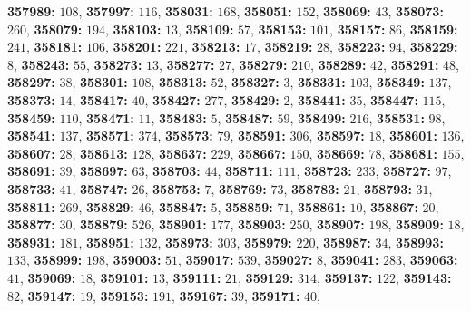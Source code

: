 \textsf{\bfseries 357989:} $108$, \textsf{\bfseries 357997:} $116$, \textsf{\bfseries 358031:} $168$, \textsf{\bfseries 358051:} $152$, \textsf{\bfseries 358069:} $43$, \textsf{\bfseries 358073:} $260$, \textsf{\bfseries 358079:} $194$, \textsf{\bfseries 358103:} $13$, \textsf{\bfseries 358109:} $57$, \textsf{\bfseries 358153:} $101$, \textsf{\bfseries 358157:} $86$, \textsf{\bfseries 358159:} $241$, \textsf{\bfseries 358181:} $106$, \textsf{\bfseries 358201:} $221$, \textsf{\bfseries 358213:} $17$, \textsf{\bfseries 358219:} $28$, \textsf{\bfseries 358223:} $94$, \textsf{\bfseries 358229:} $8$, \textsf{\bfseries 358243:} $55$, \textsf{\bfseries 358273:} $13$, \textsf{\bfseries 358277:} $27$, \textsf{\bfseries 358279:} $210$, \textsf{\bfseries 358289:} $42$, \textsf{\bfseries 358291:} $48$, \textsf{\bfseries 358297:} $38$, \textsf{\bfseries 358301:} $108$, \textsf{\bfseries 358313:} $52$, \textsf{\bfseries 358327:} $3$, \textsf{\bfseries 358331:} $103$, \textsf{\bfseries 358349:} $137$, \textsf{\bfseries 358373:} $14$, \textsf{\bfseries 358417:} $40$, \textsf{\bfseries 358427:} $277$, \textsf{\bfseries 358429:} $2$, \textsf{\bfseries 358441:} $35$, \textsf{\bfseries 358447:} $115$, \textsf{\bfseries 358459:} $110$, \textsf{\bfseries 358471:} $11$, \textsf{\bfseries 358483:} $5$, \textsf{\bfseries 358487:} $59$, \textsf{\bfseries 358499:} $216$, \textsf{\bfseries 358531:} $98$, \textsf{\bfseries 358541:} $137$, \textsf{\bfseries 358571:} $374$, \textsf{\bfseries 358573:} $79$, \textsf{\bfseries 358591:} $306$, \textsf{\bfseries 358597:} $18$, \textsf{\bfseries 358601:} $136$, \textsf{\bfseries 358607:} $28$, \textsf{\bfseries 358613:} $128$, \textsf{\bfseries 358637:} $229$, \textsf{\bfseries 358667:} $150$, \textsf{\bfseries 358669:} $78$, \textsf{\bfseries 358681:} $155$, \textsf{\bfseries 358691:} $39$, \textsf{\bfseries 358697:} $63$, \textsf{\bfseries 358703:} $44$, \textsf{\bfseries 358711:} $111$, \textsf{\bfseries 358723:} $233$, \textsf{\bfseries 358727:} $97$, \textsf{\bfseries 358733:} $41$, \textsf{\bfseries 358747:} $26$, \textsf{\bfseries 358753:} $7$, \textsf{\bfseries 358769:} $73$, \textsf{\bfseries 358783:} $21$, \textsf{\bfseries 358793:} $31$, \textsf{\bfseries 358811:} $269$, \textsf{\bfseries 358829:} $46$, \textsf{\bfseries 358847:} $5$, \textsf{\bfseries 358859:} $71$, \textsf{\bfseries 358861:} $10$, \textsf{\bfseries 358867:} $20$, \textsf{\bfseries 358877:} $30$, \textsf{\bfseries 358879:} $526$, \textsf{\bfseries 358901:} $177$, \textsf{\bfseries 358903:} $250$, \textsf{\bfseries 358907:} $198$, \textsf{\bfseries 358909:} $18$, \textsf{\bfseries 358931:} $181$, \textsf{\bfseries 358951:} $132$, \textsf{\bfseries 358973:} $303$, \textsf{\bfseries 358979:} $220$, \textsf{\bfseries 358987:} $34$, \textsf{\bfseries 358993:} $133$, \textsf{\bfseries 358999:} $198$, \textsf{\bfseries 359003:} $51$, \textsf{\bfseries 359017:} $539$, \textsf{\bfseries 359027:} $8$, \textsf{\bfseries 359041:} $283$, \textsf{\bfseries 359063:} $41$, \textsf{\bfseries 359069:} $18$, \textsf{\bfseries 359101:} $13$, \textsf{\bfseries 359111:} $21$, \textsf{\bfseries 359129:} $314$, \textsf{\bfseries 359137:} $122$, \textsf{\bfseries 359143:} $82$, \textsf{\bfseries 359147:} $19$, \textsf{\bfseries 359153:} $191$, \textsf{\bfseries 359167:} $39$, \textsf{\bfseries 359171:} $40$, 
